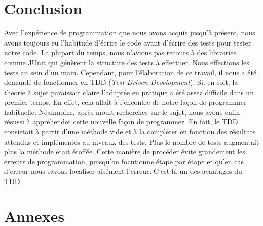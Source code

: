 \documentclass[11pt]{report}
\begin{document}
\chapter{Conclusion}
	Avec l'expérience de programmation que nous avons acquis jusqu'à présent, nous avons toujours eu l'habitude d'écrire le code avant d'écrire des tests pour tester notre code. La plupart du temps, nous n'avions pas recours à des librairies comme JUnit qui génèrent la structure des tests à effectuer. Nous effections les tests au sein d'un main. Cependant, pour l'élaboration de ce travail, il nous a été demandé de fonctionner en TDD (\textit{Test Driven Development}). Si, en soit, la théorie à sujet paraissait claire l'adaptée en pratique a été assez difficile dans un premier temps. En effet, cela allait à l'encontre de notre façon de programmer habituelle. Néanmoins, après moult recherches sur le sujet, nous avons enfin résussi à appréhender cette nouvelle façon de programmer. En fait, le TDD consistait à partir d'une méthode vide et à la compléter en fonction des résultats attendus et implémentés au niveaux des tests. Plus le nombre de tests augmentait plus la méthode était étoffée. Cette manière de procéder évite grandement les erreurs de programmation, puisqu'on focntionne étape par étape et qu'en cas d'erreur nous savons localiser aisément l'erreur. C'est là un des avantages du TDD.     

\chapter{Annexes}
		
		
		
\end{document}
